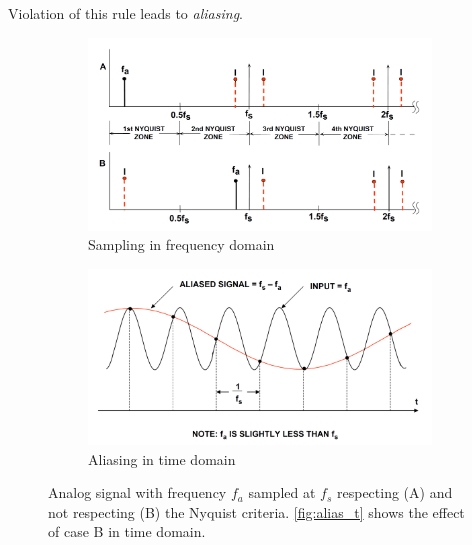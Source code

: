 Violation of this rule leads to \textit{aliasing}.


\begin{figure}[tbh]
	\centering
	\begin{subfigure}{\textwidth}
		\centering
		\includegraphics[width=\linewidth]{chap/02-theory/img/alias_f}  
		\caption{Sampling in frequency domain}
		\label{fig:alias_f}
	\end{subfigure}
	\begin{subfigure}{\textwidth}
		\centering
		\includegraphics[width=\linewidth]{chap/02-theory/img/alias_t}  
		\caption{Aliasing in time domain}
		\label{fig:alias_t}
	\end{subfigure}
	\caption[Aliasing]{Analog signal with frequency $f_a$ sampled at $f_s$ respecting (A) and not respecting (B) the Nyquist criteria. \autoref{fig:alias_t} shows the effect of case B in time domain. \cite{walt}}
\end{figure}


